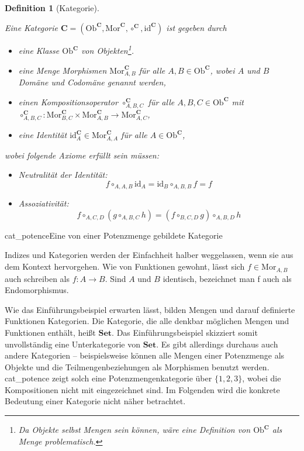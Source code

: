\documentclass[11pt, a4paper, bibgerm]{scrbook}
\newcommand\abb{}
\newcommand\fig{}
\newcommand\ato{\rightarrow} %
\newtheorem{defini}{Definition}
\newcommand{\defi}[2]{%
  \begin{defini}[#1]
    \label{def:#1}
    #2
  \end{defini}
}
\begin{document}
\defi{Kategorie}{
Eine Kategorie $\mathbf{C} = (\mathrm{Ob}^\mathbf{C}, \mathrm{Mor}^\mathbf{C},
\circ^\mathbf{C}, \mathrm{id}^\mathbf{C})$ ist gegeben durch
\begin{itemize}
\item eine Klasse $\mathrm{Ob}^\mathbf{C}$ von Objekten\footnote{Da Objekte selbst Mengen
    sein können, wäre eine Definition von $\mathrm{Ob}^\mathbf{C}$ als Menge problematisch.}.
\item eine Menge Morphismen $\mathrm{Mor}^\mathbf{C}_{A,B}$ für alle $ A,B \in
  \mathrm{Ob}^\mathbf{C}$, wobei $A$ und $B$ Domäne und Codomäne genannt werden,
\item einen Kompositionsoperator $\circ^\mathbf{C}_{A,B,C}$ für alle $
  A,B,C \in \mathrm{Ob}^\mathbf{C}$ mit \\
  $\circ^\mathbf{C}_{A,B,C} : \mathrm{Mor}^\mathbf{C}_{B,C} \times
  \mathrm{Mor}^\mathbf{C}_{A,B} \rightarrow \mathrm{Mor}^\mathbf{C}_{A,C}$,
\item eine Identität $\mathrm{id}^\mathbf{C}_A \in \mathrm{Mor}^\mathbf{C}_{A,A}$ für alle $ A \in \mathrm{Ob}^\mathbf{C}$,
\end{itemize}
wobei folgende Axiome erfüllt sein müssen:
\begin{itemize}
\item Neutralität der Identität: $$f \circ_{A,A,B} \mathrm{id}_A = \mathrm{id}_B \circ_{A,B,B} f = f$$
\item Assoziativität:
  $$f \circ_{A,C,D} (g \circ_{A,B,C} h) = (f \circ_{B,C,D} g) \circ_{A,B,D}h$$
\end{itemize}
}

\fig{cat_potence}{Eine von einer Potenzmenge gebildete Kategorie}

Indizes und Kategorien werden der Einfachheit halber weggelassen, wenn
sie aus dem Kontext hervorgehen. Wie von Funktionen gewohnt, lässt sich
$f \in \mathrm{Mor}_{A,B}$ auch schreiben als $f : A \ato B$. Sind $A$
und $B$ identisch, bezeichnet man f auch als Endomorphismus.

Wie das Einführungsbeispiel erwarten lässt, bilden Mengen und darauf
definierte Funktionen Kategorien. Die Kategorie, die alle denkbar
möglichen Mengen und Funktionen enthält, heißt $\mathbf{Set}$. Das
Einführungsbeispiel skizziert somit unvollständig eine Unterkategorie
von $\mathbf{Set}$. Es gibt allerdings durchaus auch andere Kategorien --
beispielsweise können alle Mengen einer Potenzmenge als Objekte und die
Teilmengenbeziehungen als Morphismen benutzt werden. \abb{cat_potence}
zeigt solch eine Potenzmengenkategorie über $\{1,2,3\}$, wobei die
Kompositionen nicht mit eingezeichnet sind. Im Folgenden wird die
konkrete Bedeutung einer Kategorie nicht näher betrachtet.
\end{document}
